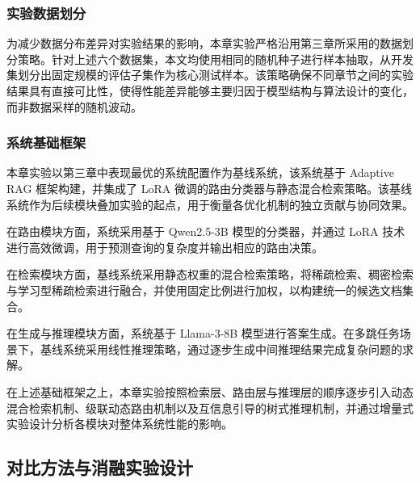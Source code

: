 
\subsubsection{实验数据划分}

为减少数据分布差异对实验结果的影响，本章实验严格沿用第三章所采用的数据划分策略。针对上述六个数据集，本文均使用相同的随机种子进行样本抽取，从开发集划分出固定规模的评估子集作为核心测试样本。该策略确保不同章节之间的实验结果具有直接可比性，使得性能差异能够主要归因于模型结构与算法设计的变化，而非数据采样的随机波动。


\subsubsection{系统基础框架}

本章实验以第三章中表现最优的系统配置作为基线系统，该系统基于 Adaptive RAG 框架构建，并集成了 LoRA 微调的路由分类器与静态混合检索策略。该基线系统作为后续模块叠加实验的起点，用于衡量各优化机制的独立贡献与协同效果。

在路由模块方面，系统采用基于 Qwen2.5-3B 模型的分类器，并通过 LoRA 技术进行高效微调，用于预测查询的复杂度并输出相应的路由决策。

在检索模块方面，基线系统采用静态权重的混合检索策略，将稀疏检索、稠密检索与学习型稀疏检索进行融合，并使用固定比例进行加权，以构建统一的候选文档集合。

在生成与推理模块方面，系统基于 Llama-3-8B 模型进行答案生成。在多跳任务场景下，基线系统采用线性推理策略，通过逐步生成中间推理结果完成复杂问题的求解。

在上述基础框架之上，本章实验按照检索层、路由层与推理层的顺序逐步引入动态混合检索机制、级联动态路由机制以及互信息引导的树式推理机制，并通过增量式实验设计分析各模块对整体系统性能的影响。


\subsection{对比方法与消融实验设计}

